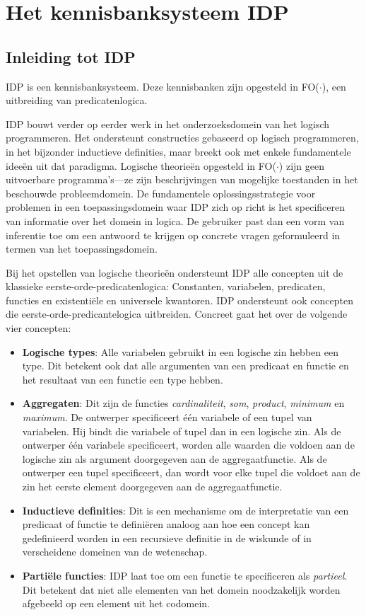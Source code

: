\chapter{Het kennisbanksysteem IDP}\label{sec:rol-idp}
\section{Inleiding tot IDP}
IDP is een kennisbanksysteem\cite{DeCatBroes2014PLaa}. Deze kennisbanken zijn opgesteld in FO($\cdot$), een uitbreiding van predicatenlogica.

IDP bouwt verder op eerder werk in het onderzoeksdomein van het logisch programmeren. Het ondersteunt constructies gebaseerd op logisch programmeren, in het bijzonder inductieve definities, maar breekt ook met enkele fundamentele idee\"en uit dat paradigma. Logische theorie\"en opgesteld in FO($\cdot$) zijn geen uitvoerbare programma's---ze zijn beschrijvingen van mogelijke toestanden in het beschouwde probleemdomein. De fundamentele oplossingsstrategie voor problemen in een toepassingsdomein waar IDP zich op richt is het specificeren van informatie over het domein in logica. De gebruiker past dan een vorm van inferentie toe om een antwoord te krijgen op concrete vragen geformuleerd in termen van het toepassingsdomein.

Bij het opstellen van logische theorie\"en ondersteunt IDP alle concepten uit de klassieke eerste-orde-predicatenlogica: Constanten, variabelen, predicaten, functies en existenti\"ele en universele kwantoren. IDP ondersteunt ook concepten die eerste-orde-predicantelogica uitbreiden. Concreet gaat het over de volgende vier concepten:

\begin{itemize}
	\item \textbf{Logische types}: Alle variabelen gebruikt in een logische zin hebben een type. Dit betekent ook dat alle argumenten van een predicaat en functie en het resultaat van een functie een type hebben.
	\item \textbf{Aggregaten}: Dit zijn de functies \textit{cardinaliteit}, \textit{som}, \textit{product}, \textit{minimum} en \textit{maximum}. De ontwerper specificeert \'e\'en variabele of een tupel van variabelen. Hij bindt die variabele of tupel dan in een logische zin. Als de ontwerper \'e\'en variabele specificeert, worden alle waarden die voldoen aan de logische zin als argument doorgegeven aan de aggregaatfunctie. Als de ontwerper een tupel specificeert, dan wordt voor elke tupel die voldoet aan de zin het eerste element doorgegeven aan de aggregaatfunctie.
	\item \textbf{Inductieve definities}: Dit is een mechanisme om de interpretatie van een predicaat of functie te defini\"eren analoog aan hoe een concept kan gedefinieerd worden in een recursieve definitie in de wiskunde of in verscheidene domeinen van de wetenschap.
	\item \textbf{Parti\"ele functies}: IDP laat toe om een functie te specificeren als \textit{partieel}. Dit betekent dat niet alle elementen van het domein noodzakelijk worden afgebeeld op een element uit het codomein.
\end{itemize}

